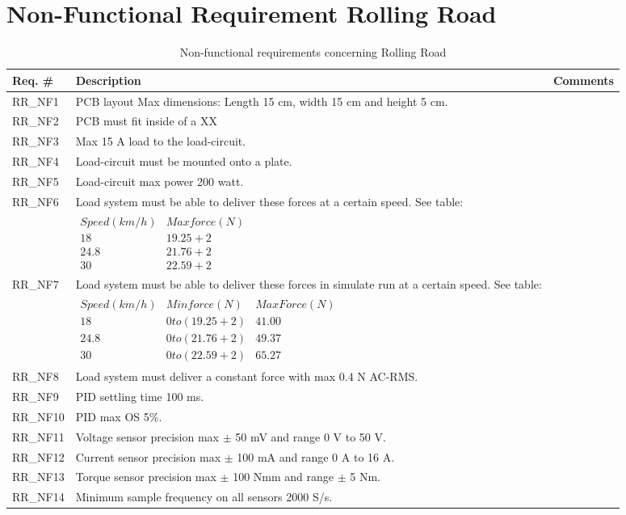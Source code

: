 \section{Non-Functional Requirement Rolling Road}

\begin{table}[h!]
	\label{FREQ_AU2}
	\centering
	\begin{tabular}{|p{2 cm}|p{10 cm}|p{2 cm}|}
		\hline
		\textbf{Req. \#} & \textbf{Description} & \textbf{Comments} \\\hline
		RR\_NF1
		& PCB layout Max dimensions: Length 15 cm, width 15 cm and height 5 cm. 
		&  \\ \hline
		RR\_NF2
		& PCB must fit inside of a XX 
		& \\ \hline
		RR\_NF3
		& Max 15 A load to the load-circuit.
		& \\ \hline
		RR\_NF4
		& Load-circuit must be mounted onto a plate. 
		& \\ \hline
		RR\_NF5
		& Load-circuit max power 200 watt.
		& \\ \hline
		RR\_NF6 
		& Load system must be able to deliver these forces at a certain speed. See table: 
		& \\ &
		$\begin{array}{c|c}
			Speed (km/h) & Max force (N) \\ 
			18 & 19.25+2 \\ 
			24.8 & 21.76+2 \\ 
			30 & 22.59+2
		\end{array} $
		& \\ \hline
		RR\_NF7
		& Load system must be able to deliver these forces in simulate run at a certain speed. See table:
		& \\ &
		$\begin{array}{c|c|c}
			Speed (km/h) & Min force (N) & Max Force (N) \\ 
			18 & 0 to (19.25+2) & 41.00 \\ 
			24.8 & 0 to (21.76+2) & 49.37 \\ 
			30 & 0 to (22.59+2) & 65.27
		\end{array}$
		& \\ \hline
		RR\_NF8
		& Load system must deliver a constant force with max 0.4 N AC-RMS. 
		& \\ \hline
		RR\_NF9
		& PID settling time 100 ms. 
		&  \\ \hline
		RR\_NF10
		& PID max OS 5\%. 
		&  \\ \hline
		RR\_NF11
		& Voltage sensor precision max $\pm$ 50 mV and range 0 V to 50 V. 
		&  \\ \hline
		RR\_NF12
		& Current sensor precision max $\pm$ 100 mA and range 0 A to 16 A. 
		&  \\ \hline
		RR\_NF13
		& Torque sensor precision max $\pm$ 100 Nmm and range $\pm$ 5 Nm. 
		&  \\ \hline
		RR\_NF14
		& Minimum sample frequency on all sensors 2000 S/s.  
		&  \\ \hline
	\end{tabular}
	\caption{Non-functional requirements concerning Rolling Road}
\end{table}


